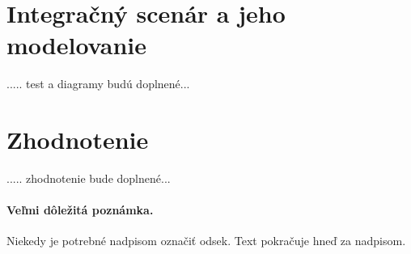 \documentclass[10pt,twoside,slovak,a4paper]{article}
\begin{document}
\section{Integračný scenár a jeho modelovanie} \label{5sek}

..... test a diagramy budú doplnené... \\




\section{Zhodnotenie} \label{6sek} %
..... zhodnotenie bude doplnené... \\


\paragraph{Veľmi dôležitá poznámka.}
Niekedy je potrebné nadpisom označiť odsek. Text pokračuje hneď za nadpisom.






\end{document}
